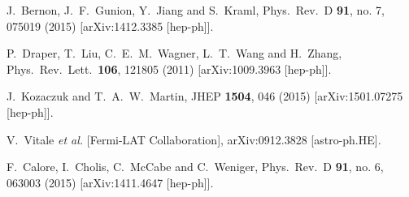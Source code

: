 \documentclass[preprintnumbers,superscriptaddress,nofootinbib,aps,prd,floatfix]{revtex4}
\begin{document}
\begin{thebibliography}{99}
  J.~Bernon, J.~F.~Gunion, Y.~Jiang and S.~Kraml,
  Phys.\ Rev.\ D {\bf 91}, no. 7, 075019 (2015)
  [arXiv:1412.3385 [hep-ph]].
 
  P.~Draper, T.~Liu, C.~E.~M.~Wagner, L.~T.~Wang and H.~Zhang,
  Phys.\ Rev.\ Lett.\  {\bf 106}, 121805 (2011)
  [arXiv:1009.3963 [hep-ph]].

  J.~Kozaczuk and T.~A.~W.~Martin,
  JHEP {\bf 1504}, 046 (2015)
  [arXiv:1501.07275 [hep-ph]].
 
  V.~Vitale {\it et al.} [Fermi-LAT Collaboration],
  arXiv:0912.3828 [astro-ph.HE].
 
  F.~Calore, I.~Cholis, C.~McCabe and C.~Weniger,
  Phys.\ Rev.\ D {\bf 91}, no. 6, 063003 (2015)
  [arXiv:1411.4647 [hep-ph]].
 

\end{thebibliography}
\end{document}

